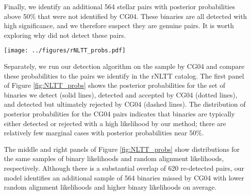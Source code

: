 \documentclass[usenatbib]{mnras}
\begin{document}
Finally, we identify an additional 564 stellar pairs with posterior probabilities above 50\% that were not identified by CG04. These binaries are all detected with high significance, and we therefore suspect they are genuine pairs. It is worth exploring why \citet{chaname04} did not detect these pairs.


\begin{figure*}
\begin{center}
\texttt{[image: ../figures/rNLTT\_probs.pdf]}
\caption{ The left-most panel shows the distribution of posterior probabilities for the pairs we detect (solid line) as well as the pairs in the CG04 catalog that are identified and accepted (dotted line) and identified and rejected (dashed line). Our method typically accepts or rejects pairs of stars with very high likelihood; there are relatively few pairs with posterior probabilities not close to either zero or unity. The middle and right panels show distributions for the same samples of binary likelihoods and random alignment likelihoods, respectively. Although there is a substantial overlap of 620 re-detected pairs, our model identifies an additional sample of 564 binaries missed by CG04 with lower random alignment likelihoods and higher binary likelihoods on average. }
\label{fig:NLTT_probs}
\end{center}
\end{figure*}


Separately, we run our detection algorithm on the sample by CG04 and compare these probabilities to the pairs we identify in the rNLTT catalog. The first panel of Figure \ref{fig:NLTT_probs} shows the posterior probabilities for the set of binaries we detect (solid lines), detected and accepted by CG04 (dotted lines), and detected but ultimately rejected by CG04 (dashed lines). The distribution of posterior probabilities for the CG04 pairs indicates that binaries are typically either detected or rejected with a high likelihood by our method; there are relatively few marginal cases with posterior probabilities near 50\%.


The middle and right panels of Figure \ref{fig:NLTT_probs} show distributions for the same samples of binary likelihoods and random alignment likelihoods, respectively. Although there is a substantial overlap of 620 re-detected pairs, our model identifies an additional sample of 564 binaries missed by CG04 with lower random alignment likelihoods and higher binary likelihoods on average. 
\end{document}

